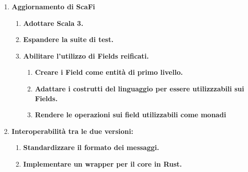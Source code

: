 \documentclass[12pt, a4paper]{article}
\begin{document}
\begin{enumerate}
    \item \textbf{Aggiornamento di ScaFi}
        \begin{enumerate}
            \item \textbf{Adottare Scala 3.}
            \item \textbf{Espandere la suite di test.}
            \item \textbf{Abilitare l'utilizzo di Fields reificati.}
            \begin{enumerate}
                \item \textbf{Creare i Field come entità di primo livello.} 
                \item \textbf{Adattare i costrutti del linguaggio per essere utilizzzabili sui Fields.}
                \item \textbf{Rendere le operazioni sui field utilizzabili come monadi}
            \end{enumerate}
        \end{enumerate}

    \item \textbf{Interoperabilità tra le due versioni:}
        \begin{enumerate}
            \item \textbf{Standardizzare il formato dei messaggi.}
            \item \textbf{Implementare un wrapper per il core in Rust.}
        \end{enumerate}
\end{enumerate}
\end{document}
